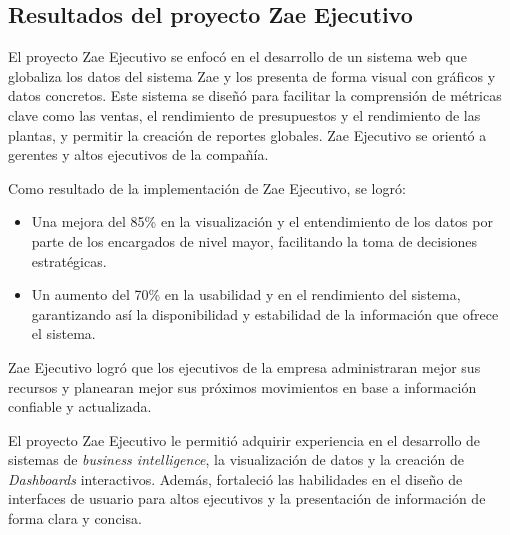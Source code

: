 \documentclass[protocolo.tex]{subfiles}
\begin{document}
\subsection{Resultados del proyecto Zae Ejecutivo}

El proyecto Zae Ejecutivo se enfocó en el desarrollo de un sistema web que globaliza los datos del sistema Zae y los presenta de forma visual con gráficos  y  datos  concretos.  Este sistema se diseñó para  facilitar  la  comprensión  de  métricas  clave  como  las  ventas,  el  rendimiento  de  presupuestos  y  el  rendimiento  de  las  plantas,  y  permitir  la  creación  de  reportes  globales.  Zae  Ejecutivo  se  orientó  a  gerentes  y  altos  ejecutivos  de  la  compañía.\vspace{4mm}

Como resultado de la implementación de Zae Ejecutivo, se logró:

\begin{itemize}
\item Una mejora del 85\%  en la visualización y el entendimiento de los datos por parte de los encargados de nivel mayor,  facilitando la toma de decisiones estratégicas.
\item Un aumento del 70\% en la usabilidad y en el rendimiento del sistema, garantizando así la disponibilidad y estabilidad de la información que ofrece el sistema.
\end{itemize}

Zae Ejecutivo logró que los ejecutivos de la empresa administraran mejor sus recursos y  planearan mejor  sus  próximos  movimientos  en  base a información confiable  y  actualizada.\vspace{4mm}

El proyecto Zae Ejecutivo le permitió adquirir experiencia en el desarrollo de sistemas de  \textit{business intelligence}, la visualización de datos y la creación de  \textit{Dashboards}  interactivos. Además, fortaleció las habilidades en  el  diseño  de interfaces  de  usuario  para  altos  ejecutivos y la presentación de información de forma clara  y concisa.
\end{document}
